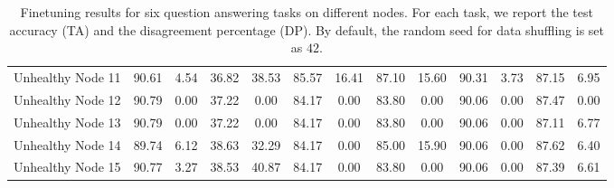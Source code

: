 \begin{table*}[t]
\begin{center}
\begin{tiny}
\begin{sc}
\begin{tabular}{ccccccccccccc}
Unhealthy Node 11 & 90.61 & 4.54 & 36.82 & 38.53 & 85.57 & 16.41 & 87.10 & 15.60 & 90.31 & 3.73  & 87.15 & 6.95 \\
Unhealthy Node 12 & 90.79 & 0.00 & 37.22 & 0.00 & 84.17 & 0.00 & 83.80 & 0.00 & 90.06 & 0.00  & 87.47 & 0.00\\
Unhealthy Node 13 & 90.79 & 0.00 & 37.22 & 0.00 & 84.17 & 0.00 & 83.80 & 0.00 & 90.06 & 0.00  & 87.11 & 6.77 \\
Unhealthy Node 14 & 89.74 & 6.12 & 38.63 & 32.29 & 84.17 & 0.00 & 85.00 & 15.90 & 90.06 & 0.00  & 87.62 & 6.40 \\
Unhealthy Node 15 & 90.77 & 3.27 & 38.53 & 40.87 & 84.17 & 0.00 & 83.80 & 0.00 & 90.06 & 0.00  & 87.39 & 6.61 \\
\bottomrule
\end{tabular}

\end{sc}
\end{tiny}
\end{center}

\caption{Finetuning results for six question answering tasks on different nodes. For each task, we report the test accuracy (TA) and the disagreement percentage (DP).  By default, the random seed for data shuffling is set as $42$. }
\label{tab:finetuning_results}

\vskip -0.15in
\end{table*}








